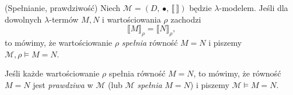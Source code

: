   \begin{definicja}(Spełnianie, prawdziwość)
    Niech \(\mathcal{M}=(D,\,\bullet,\,\llbracket\,\rrbracket)\) będzie \(\lambda\)-modelem.
    Jeśli dla dowolnych \(\lambda\)-termów \(M, N\) i wartościowania \(\rho\) zachodzi
    \[
      \llbracket M \rrbracket_\rho = \llbracket N \rrbracket_\rho,
    \]
    to mówimy, że wartościowanie \(\rho\) \emph{spełnia} równość \(M=N\) i piszemy \(\mathcal{M},\rho\models M=N.\)

    Jeśli każde wartościowanie \(\rho\) spełnia równość \(M=N\), to mówimy, że równość \(M=N\) jest \emph{prawdziwa} w \(\mathcal{M}\) (lub \(\mathcal{M}\) \emph{spełnia} \(M=N\)) i piszemy \(\mathcal{M}\models M=N\).
  \end{definicja}



